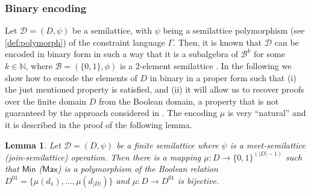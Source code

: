 \documentclass[11pt]{article}
\newcommand{\Max}{\textsf{Max}}
\newcommand{\Min}{\textsf{Min}}
\newcommand{\1}{\textbf{1}}
\newcommand\uval{{(|D|-1)}}
\newtheorem{lemma}[theorem]{Lemma}
\begin{document}
\subsubsection{Binary encoding}\label{sect:binencoding}
{Let} $\mathcal{D} = (D,\psi)$ {be} a semilattice{, with} $\psi$ {being} a semilattice polymorphism (see \cref{def:polymorph}) of the constraint language $\Gamma$.
Then, it is known that $\mathcal{D}$ can be encoded in binary form in such a way that it is a subalgebra of $\mathcal{B}^k$ {for some $k \in \mathbb{N}$}, where $\mathcal{B} = (\{0, 1\}, \phi)$ is a 2-element semilattice \cite{DonaPapert1964}.
In the following we show how to encode the elements of $D$ in binary in a proper form such that (i) the just mentioned property \cite{DonaPapert1964} is satisfied, and (ii) it will allow us to recover proofs {over the finite domain $D$} from the Boolean domain, a property that is not guaranteed by the approach considered in \cite{BulatovRSTOC22}.
The encoding $\mu$ is very ``natural'' and it is described in the proof of the following lemma.\begin{lemma}\label{th:bin_encoding}
    Let $\mathcal{D} = (D,\psi)$ be a finite semilattice where $\psi$ is a meet-semilattice (join-semilattice) operation. Then there is a mapping $\mu:D\rightarrow \{0,1\}^{\uval}$ such that $\Min$ ($\Max$) is a polymorphism of {the Boolean relation} $D^{01}=\{\mu(d_1),\ldots,\mu(d_{|D|})\}$ and $\mu:D\rightarrow D^{01}$ is bijective.
\end{lemma}
\end{document}
